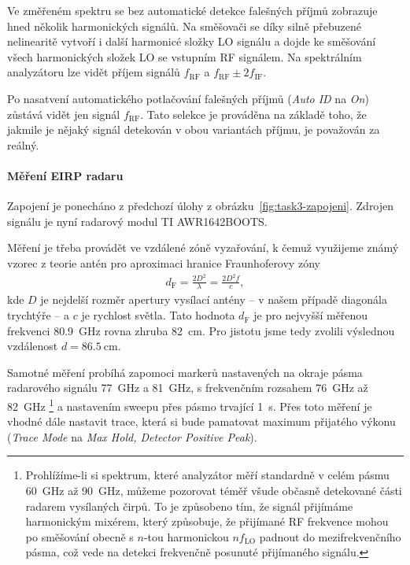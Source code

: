 \documentclass[11pt,a4paper]{article}
\begin{document}
Ve změřeném spektru se bez automatické detekce falešných příjmů zobrazuje hned několik harmonických signálů. Na směšovači se díky silně přebuzené nelinearitě vytvoří i další harmonicé složky LO signálu a dojde ke směšování všech harmonických složek LO se vstupním RF signálem. Na spektrálním analyzátoru lze vidět příjem signálů $f_{\mathrm{RF}}$ a $f_{\mathrm{RF}}\pm2f_{\mathrm{IF}}$.

Po nasatvení automatického potlačování falešných příjmů (\emph{Auto ID} na \emph{On}) zůstává vidět jen signál $f_{\mathrm{RF}}$. Tato selekce je prováděna na základě toho, že jakmile je nějaký signál detekován v obou variantách příjmu, je považován za reálný.

\paragraph*{Měření EIRP radaru} Zapojení je ponecháno z předchozí úlohy z obrázku~\ref{fig:task3-zapojeni}. Zdrojen signálu je nyní radarový modul TI AWR1642BOOTS.

Měření je třeba provádět ve vzdálené zóně vyzařování, k čemuž využijeme známý vzorec z teorie antén pro aproximaci hranice Fraunhoferovy zóny
\begin{align}
    \label{eq:farfield}
    d_{\mathrm F} = \frac{2D^2}{\lambda} = \frac{2D^2f}{c},
\end{align}
kde $D$ je nejdelší rozměr apertury vysílací antény -- v našem případě diagonála trychtýře -- a $c$ je rychlost světla. Tato hodnota $d_{\mathrm F}$ je pro nejvyšší měřenou frekvenci 80.9~GHz rovna zhruba 82~cm. Pro jistotu jsme tedy zvolili výslednou vzdálenost $d = 86.5\ \mathrm{cm}$.

Samotné měření probíhá zapomoci markerů nastavených na okraje pásma radarového signálu 77~GHz a 81~GHz, s frekvenčním rozsahem 76~GHz až 82~GHz%
    \footnote{Prohlížíme-li si spektrum, které analyzátor měří standardně v celém pásmu 60~GHz až 90~GHz, můžeme pozorovat téměř všude občasně detekované části radarem vysílaných čirpů. To je způsobeno tím, že signál přijímáme harmonickým mixérem, který způsobuje, že přijímané RF frekvence mohou po směšování obecně s $n$-tou harmonickou $nf_{\mathrm{LO}}$ padnout do mezifrekvenčního pásma, což vede na detekci frekvenčně posunuté  přijímaného signálu.}
a nastavením sweepu přes pásmo trvající 1~s. Přes toto měření je vhodné dále nastavit trace, která si bude pamatovat maximum přijatého výkonu (\emph{Trace Mode} na \emph{Max Hold, Detector Positive Peak}).
\end{document}

